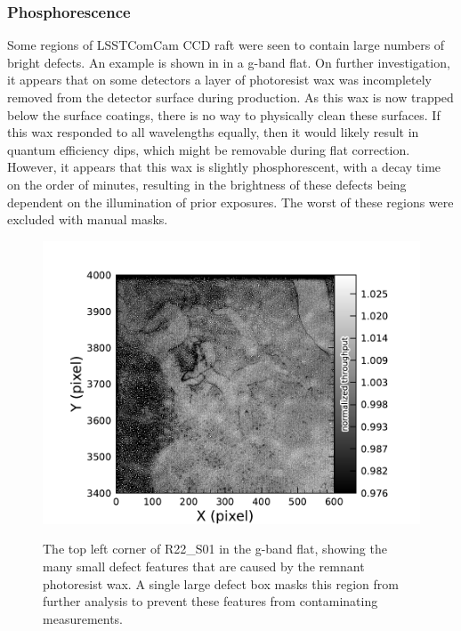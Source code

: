 \subsubsection{Phosphorescence}
Some regions of LSSTComCam CCD raft were seen to contain large numbers of bright defects.
An example is shown in    in a g-band flat. 
On further investigation, it appears that on some detectors a layer of photoresist wax was incompletely removed from the detector surface during production.
As this wax is now trapped below the surface coatings, there is no way to physically clean these surfaces.
If this wax responded to all wavelengths equally, then it would likely result in quantum efficiency dips, which might be removable during flat correction.
However, it appears that this wax is slightly phosphorescent, with a decay time on the order of minutes, resulting in the brightness of these defects being dependent on the illumination of prior exposures.
The worst of these regions were excluded with manual masks.
\begin{figure}[htb!]
  \centering
  \includegraphics[width=0.98\linewidth]{figures/dp1_isr_anomalies-phosphorescence.pdf}
  \label{fig:anomalies_phosphorescence}
  \caption{
    The top left corner of R22\_S01 in the g-band flat, showing the many small defect features that are caused by the remnant photoresist wax.
    A single large defect box masks this region from further analysis to prevent these features from contaminating measurements.
  }
\end{figure}

